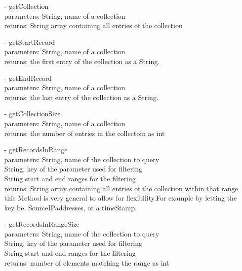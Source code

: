 \documentclass[oneside, english, final]{design}
\begin{document}
\begin{itemize}
\begin{itemize}
		      \item[-]getCollection
		            \\parameters: String, name of a collection
		            \\returns: String array containing all entries of the collection

		      \item[-]getStartRecord
		            \\parameters: String, name of a collection
		            \\returns: the first entry of the collection as a String.

		      \item[-]getEndRecord
		            \\parameters: String, name of a collection
		            \\returns: the last entry of the collection as a String.

		      \item[-]getCollectionSize
		            \\parameters: String, name of a collection
		            \\returns: the number of entries in the collectoin as int

		      \item[-]getRecordsInRange
		            \\parameters: String, name of the collection to query
		            \\String, key of the parameter used for filtering
		            \\String start and end ranges for the filtering
		            \\returns: String array containing all entries of the collection within that range
		            \\this Method is very general to allow for flexibility.For example by letting the key be, SourceIPaddresses, or a timeStamp.

		      \item[-]getRecordsInRangeSize
		            \\parameters: String, name of the collection to query
		            \\String, key of the parameter used for filtering
		            \\String start and end ranges for the filtering
		            \\returns: number of elements matching the range as int
		            

	      \end{itemize}


\end{itemize}
\end{document}
